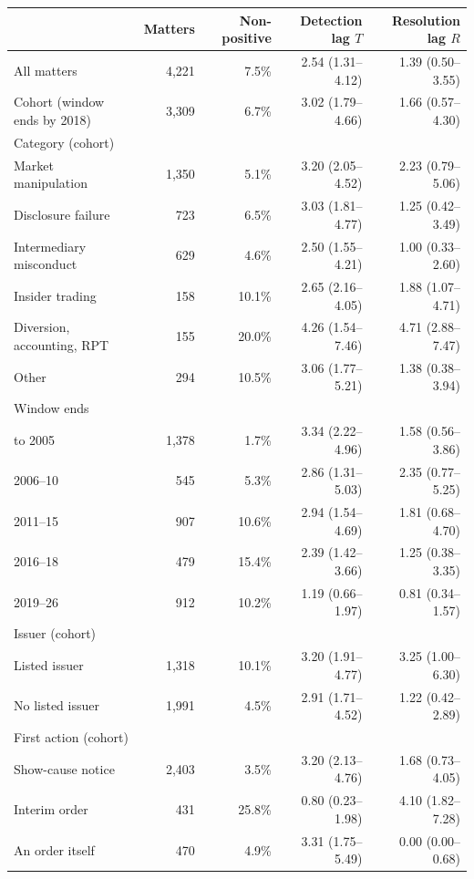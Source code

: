 \begin{tabular*}{\textwidth}[]{l@{\extracolsep\fill}rrrr}
\toprule
 & Matters & Non-positive & Detection lag $T$ & Resolution lag $R$\\
\midrule
All matters & 4,221 & 7.5\% & 2.54 (1.31--4.12) & 1.39 (0.50--3.55)\\
Cohort (window ends by 2018) & 3,309 & 6.7\% & 3.02 (1.79--4.66) & 1.66 (0.57--4.30)\\
\midrule
\multicolumn{5}{l}{Category (cohort)}\\
Market manipulation & 1,350 & 5.1\% & 3.20 (2.05--4.52) & 2.23 (0.79--5.06)\\
Disclosure failure & 723 & 6.5\% & 3.03 (1.81--4.77) & 1.25 (0.42--3.49)\\
Intermediary misconduct & 629 & 4.6\% & 2.50 (1.55--4.21) & 1.00 (0.33--2.60)\\
Insider trading & 158 & 10.1\% & 2.65 (2.16--4.05) & 1.88 (1.07--4.71)\\
Diversion, accounting, RPT & 155 & 20.0\% & 4.26 (1.54--7.46) & 4.71 (2.88--7.47)\\
Other & 294 & 10.5\% & 3.06 (1.77--5.21) & 1.38 (0.38--3.94)\\
\midrule
\multicolumn{5}{l}{Window ends}\\
to 2005 & 1,378 & 1.7\% & 3.34 (2.22--4.96) & 1.58 (0.56--3.86)\\
2006--10 & 545 & 5.3\% & 2.86 (1.31--5.03) & 2.35 (0.77--5.25)\\
2011--15 & 907 & 10.6\% & 2.94 (1.54--4.69) & 1.81 (0.68--4.70)\\
2016--18 & 479 & 15.4\% & 2.39 (1.42--3.66) & 1.25 (0.38--3.35)\\
2019--26 & 912 & 10.2\% & 1.19 (0.66--1.97) & 0.81 (0.34--1.57)\\
\midrule
\multicolumn{5}{l}{Issuer (cohort)}\\
Listed issuer & 1,318 & 10.1\% & 3.20 (1.91--4.77) & 3.25 (1.00--6.30)\\
No listed issuer & 1,991 & 4.5\% & 2.91 (1.71--4.52) & 1.22 (0.42--2.89)\\
\midrule
\multicolumn{5}{l}{First action (cohort)}\\
Show-cause notice & 2,403 & 3.5\% & 3.20 (2.13--4.76) & 1.68 (0.73--4.05)\\
Interim order & 431 & 25.8\% & 0.80 (0.23--1.98) & 4.10 (1.82--7.28)\\
An order itself & 470 & 4.9\% & 3.31 (1.75--5.49) & 0.00 (0.00--0.68)\\
\bottomrule
\end{tabular*}
